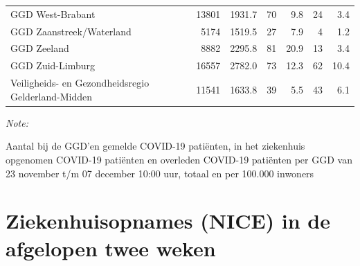 \documentclass[
  english,
  man,floatsintext]{apa6}
\begin{document}
\begin{table}
\begin{threeparttable}
\begin{tabular}{lrrrrrr}
GGD West-Brabant & 13801 & 1931.7 & 70 & 9.8 & 24 & 3.4\\
GGD Zaanstreek/Waterland & 5174 & 1519.5 & 27 & 7.9 & 4 & 1.2\\
GGD Zeeland & 8882 & 2295.8 & 81 & 20.9 & 13 & 3.4\\
GGD Zuid-Limburg & 16557 & 2782.0 & 73 & 12.3 & 62 & 10.4\\
Veiligheids- en Gezondheidsregio Gelderland-Midden & 11541 & 1633.8 & 39 & 5.5 & 43 & 6.1\\
\bottomrule
\end{tabular}
\begin{tablenotes}
\item \textit{Note: } 
\item Aantal bij de GGD’en gemelde COVID-19 patiënten, in het ziekenhuis opgenomen COVID-19 patiënten en overleden COVID-19 patiënten per GGD van 23 november t/m 07 december 10:00 uur, totaal en per 100.000 inwoners
\end{tablenotes}
\end{threeparttable}
\endgroup{}
\end{table}

\newpage

\hypertarget{ziekenhuisopnames-nice-in-de-afgelopen-twee-weken}{%
\section{Ziekenhuisopnames (NICE) in de afgelopen twee weken}\label{ziekenhuisopnames-nice-in-de-afgelopen-twee-weken}}
\end{document}
